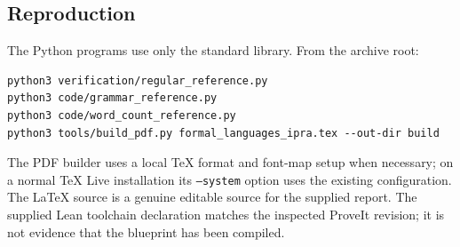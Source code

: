 \subsection{Reproduction}

The Python programs use only the standard library. From the archive root:
\begin{lstlisting}
python3 verification/regular_reference.py
python3 code/grammar_reference.py
python3 code/word_count_reference.py
python3 tools/build_pdf.py formal_languages_ipra.tex --out-dir build
\end{lstlisting}
The PDF builder uses a local TeX format and font-map setup when necessary;
on a normal TeX Live installation its \texttt{--system} option uses the
existing configuration. The LaTeX source is a genuine editable source
for the supplied report. The supplied Lean toolchain declaration matches
the inspected ProveIt revision; it is not evidence that the blueprint
has been compiled.
